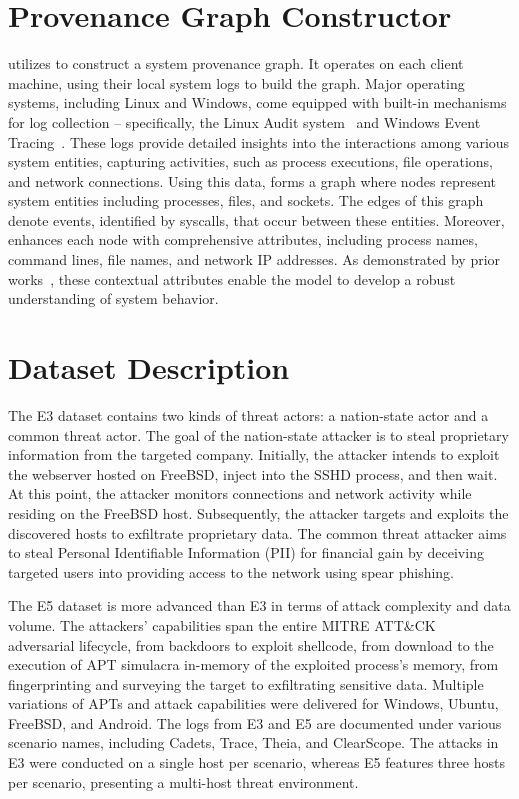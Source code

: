 \appendix


\section{Provenance Graph Constructor}
\label{sub:provconstruct}

\Sys utilizes \logs to construct a system provenance graph. It operates on each client machine, using their local system logs to build the graph. Major operating systems, including Linux and Windows, come equipped with built-in mechanisms for log collection -- specifically, the Linux Audit system~\cite{linuxaudit} and Windows Event Tracing~\cite{windowsaudit}. These logs provide detailed insights into the interactions among various system entities, capturing activities, such as process executions, file operations, and network connections. Using this data, \Sys forms a graph where nodes represent system entities including processes, files, and sockets. The edges of this graph denote events, identified by syscalls, that occur between these entities. Moreover, \Sys enhances each node with comprehensive attributes, including process names, command lines, file names, and network IP addresses. As demonstrated by prior works~\cite{flash2024,cheng2023kairos}, these contextual attributes enable the model to develop a robust understanding of system behavior.

\section{Dataset Description}
\label{sec:dataset:description}

The E3 dataset contains two kinds of threat actors: a nation-state actor and a common threat actor. The goal of the nation-state attacker is to steal proprietary information from the targeted company. Initially, the attacker intends to exploit the webserver hosted on FreeBSD, inject into the SSHD process, and then wait. At this point, the attacker monitors connections and network activity while residing on the FreeBSD host. Subsequently, the attacker targets and exploits the discovered hosts to exfiltrate proprietary data. The common threat attacker aims to steal Personal Identifiable Information (PII) for financial gain by deceiving targeted users into providing access to the network using spear phishing.

The \darpa E5 dataset is more advanced than E3 in terms of attack complexity and data volume. The attackers' capabilities span the entire MITRE ATT\&CK~\cite{xiong2022cyber} adversarial lifecycle, from backdoors to exploit shellcode, from download to the execution of APT simulacra in-memory of the exploited process’s memory, from fingerprinting and surveying the target to exfiltrating sensitive data. Multiple variations of APTs and attack capabilities were delivered for Windows, Ubuntu, FreeBSD, and Android. The logs from E3 and E5 are documented under various scenario names, including Cadets, Trace, Theia, and ClearScope. The attacks in E3 were conducted on a single host per scenario, whereas E5 features three hosts per scenario, presenting a multi-host threat environment.

